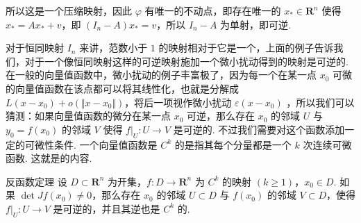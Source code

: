 所以这是一个压缩映射，因此 $\varphi$ 有唯一的不动点，即存在唯一的 $x_*\in \mathbf{R}^n$ 使得 $x_* = Ax_* + v$，即 $(I_n - A)x_* = v$，所以 $I_n - A$ 为单射，即可逆.

对于恒同映射 $I_n$ 来讲，范数小于 $1$ 的映射相对于它是一个，上面的例子告诉我们，对于一个像恒同映射这样的可逆映射施加一个微小扰动得到的映射是可逆的. 在一般的向量值函数中，微小扰动的例子丰富极了，因为每一个在某一点 $x_0$ 可微的向量值函数在该点都可以将其线性化，也就是分解成 $L(x - x_0) + o(\Vert x - x_0\Vert)$，将后一项视作微小扰动 $\varepsilon(x - x_0)$ ，所以我们可以猜测：如果向量值函数的微分在某一点 $x_0$ 可逆，那么存在 $x_0$ 的邻域 $U$ 与 $y_0 = f(x_0)$ 的邻域 $V$ 使得 $\left.f\right|_U \colon U\to V$ 是可逆的. 不过我们需要对这个函数添加一定的可微性条件. 一个向量值函数是 $C^k$ 的是指其每个分量都是一个 $k$ 次连续可微函数. 这就是的内容.

\begin{theorem}{反函数定理}{}
    设 $D\subset \mathbf{R}^n$ 为开集，$f\colon D\to\mathbf{R}^n$ 为 $C^{k}$ 的映射 $(k\geqslant 1)$，$x_0\in D$. 如果 $\det Jf(x_0)\neq 0$，那么存在 $x_0$ 的邻域 $U\subset D$ 与 $f(x_0)$ 的邻域 $V\subset D$，使得 $\left.f\right|_U \colon U\to V$ 是可逆的，并且其逆也是 $C^k$ 的.
\end{theorem}

